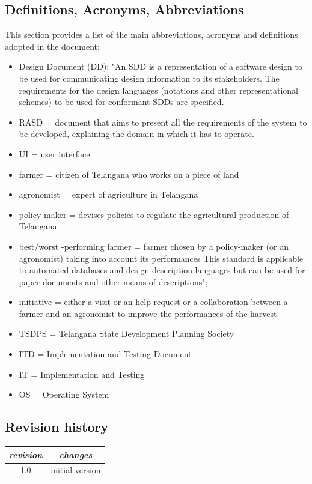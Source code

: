 \documentclass{article}
\begin{document}
\subsection{Definitions, Acronyms, Abbreviations}\label{Abbreviations}
This section provides a list of the main abbreviations, acronyms and definitions adopted in the document:
\begin{itemize}
    \item Design Document (DD): "An SDD is a representation of a software design to be used for communicating design information to its stakeholders. The requirements for the design languages (notations and other representational schemes) to be used for conformant SDDs are specified.
    \item RASD = document that aims to present all the requirements of the system to
be developed, explaining the domain in which it has to operate.
    \item UI = user interface
    \item farmer = citizen of Telangana who works on a piece of land
    \item agronomist = expert of agriculture in Telangana
    \item policy-maker = devises policies to regulate the agricultural production of
    Telangana
    \item best/worst -performing farmer = farmer chosen by a policy-maker (or an
agronomist) taking into account its performances
This standard is applicable to automated databases and design description languages but can be
used for paper documents and other means of descriptions";
\item initiative = either a visit or an help request or a collaboration between a farmer and an agronomist to improve the performances of the harvest.
\item TSDPS = Telangana State Development Planning Society
\item ITD = Implementation and Testing Document
\item IT = Implementation and Testing
\item OS = Operating System
\end{itemize}

\subsection{Revision history}
\raggedright
\begin{tabular}{ |c | c |}
\hline
 \textit{revision} & \textit{changes} \\ 
 \hline
 1.0 &  initial version\\ 
 \hline
\end{tabular}
\end{document}
